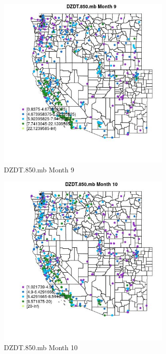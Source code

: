 \begin{figure} 
\centering  
\includegraphics[width=0.77\textwidth]{Code_Outputs/ML_input_report_ML_input_PM25_Step5_part_d_de_duplicated_aves_ML_input_MapObsMo9DZDT850mb.jpg} 
\caption{\label{fig:ML_input_report_ML_input_PM25_Step5_part_d_de_duplicated_aves_ML_inputMapObsMo9DZDT850mb}DZDT.850.mb Month 9} 
\end{figure} 
 

\begin{figure} 
\centering  
\includegraphics[width=0.77\textwidth]{Code_Outputs/ML_input_report_ML_input_PM25_Step5_part_d_de_duplicated_aves_ML_input_MapObsMo10DZDT850mb.jpg} 
\caption{\label{fig:ML_input_report_ML_input_PM25_Step5_part_d_de_duplicated_aves_ML_inputMapObsMo10DZDT850mb}DZDT.850.mb Month 10} 
\end{figure} 
 


